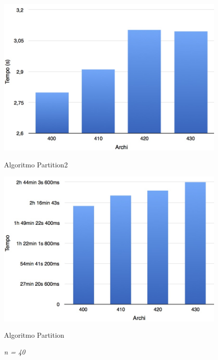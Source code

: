 \begin{figure}[h!]
	\vspace*{1cm}
	\begin{minipage}{0.40\textwidth}
		\centering
		\includegraphics[scale=.25]{img/beta4/40_4.jpg}
		\caption{Algoritmo Partition2}
	\end{minipage}\hfill
	\begin{minipage}{0.40\textwidth}
		\centering
		\includegraphics[scale=.25]{img/iole_beta4/iole_40_4.jpg}
		\caption{Algoritmo Partition}
	\end{minipage}
	\caption*{\textit{n = 40}}
\end{figure}
